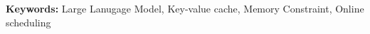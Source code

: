 \documentclass{article}
\begin{document}







\begin{abstract}

\end{abstract}
\noindent\textbf{Keywords:} Large Lanugage Model, Key-value cache, Memory Constraint, Online scheduling






















\newpage
\appendix

\end{document}
